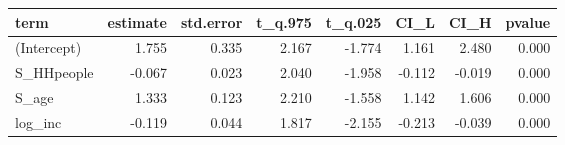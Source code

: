 \begin{tabular}{lrrrrrrr}
  \hline
term & estimate & std.error & t\_q.975 & t\_q.025 & CI\_L & CI\_H & pvalue \\ 
  \hline
(Intercept) & 1.755 & 0.335 & 2.167 & -1.774 & 1.161 & 2.480 & 0.000 \\ 
  S\_HHpeople & -0.067 & 0.023 & 2.040 & -1.958 & -0.112 & -0.019 & 0.000 \\ 
  S\_age & 1.333 & 0.123 & 2.210 & -1.558 & 1.142 & 1.606 & 0.000 \\ 
  log\_inc & -0.119 & 0.044 & 1.817 & -2.155 & -0.213 & -0.039 & 0.000 \\ 
   \hline
\end{tabular}
